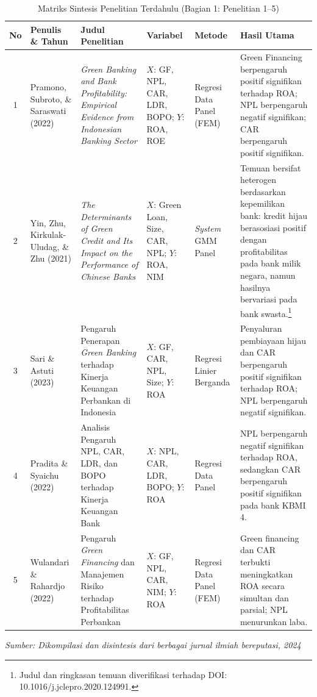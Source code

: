 \documentclass[12pt,a4paper]{article}
\numberwithin{equation}{section}
\begin{document}
\vspace{0.3cm}
\begin{table}[H]
  \caption{Matriks Sintesis Penelitian Terdahulu (Bagian 1: Penelitian 1--5)}
  \label{tab:penelitian_terdahulu_a}
  \footnotesize
  \begin{tabularx}{\textwidth}{|c|>{\raggedright\arraybackslash}p{2.3cm}|>{\raggedright\arraybackslash}X|>{\raggedright\arraybackslash}p{1.9cm}|>{\raggedright\arraybackslash}p{1.8cm}|>{\raggedright\arraybackslash}X|}
    \hline
    \textbf{No} & \textbf{Penulis \& Tahun} & \textbf{Judul Penelitian} & \textbf{Variabel} & \textbf{Metode} & \textbf{Hasil Utama} \\
    \hline
    1 & Pramono, Subroto, \& Saraswati (2022) & \emph{Green Banking and Bank Profitability: Empirical Evidence from Indonesian Banking Sector} & $X$: GF, NPL, CAR, LDR, BOPO; $Y$: ROA, ROE & Regresi Data Panel (FEM) & Green Financing berpengaruh positif signifikan terhadap ROA; NPL berpengaruh negatif signifikan; CAR berpengaruh positif signifikan. \\
    \hline
    2 & Yin, Zhu, Kirkulak-Uludag, \& Zhu (2021) & \emph{The Determinants of Green Credit and Its Impact on the Performance of Chinese Banks} & $X$: Green Loan, Size, CAR, NPL; $Y$: ROA, NIM & \emph{System} GMM Panel & Temuan bersifat heterogen berdasarkan kepemilikan bank: kredit hijau berasosiasi positif dengan profitabilitas pada bank milik negara, namun hasilnya bervariasi pada bank swasta.\footnote{Judul dan ringkasan temuan diverifikasi terhadap DOI: 10.1016/j.jclepro.2020.124991.} \\
    \hline
    3 & Sari \& Astuti (2023) & Pengaruh Penerapan \emph{Green Banking} terhadap Kinerja Keuangan Perbankan di Indonesia & $X$: GF, CAR, NPL, Size; $Y$: ROA & Regresi Linier Berganda & Penyaluran pembiayaan hijau dan CAR berpengaruh positif signifikan terhadap ROA; NPL berpengaruh negatif signifikan. \\
    \hline
    4 & Pradita \& Syaichu (2022) & Analisis Pengaruh NPL, CAR, LDR, dan BOPO terhadap Kinerja Keuangan Bank & $X$: NPL, CAR, LDR, BOPO; $Y$: ROA & Regresi Data Panel & NPL berpengaruh negatif signifikan terhadap ROA, sedangkan CAR berpengaruh positif signifikan pada bank KBMI 4. \\
    \hline
    5 & Wulandari \& Rahardjo (2022) & Pengaruh \emph{Green Financing} dan Manajemen Risiko terhadap Profitabilitas Perbankan & $X$: GF, NPL, CAR, NIM; $Y$: ROA & Regresi Data Panel (FEM) & Green financing dan CAR terbukti meningkatkan ROA secara simultan dan parsial; NPL menurunkan laba. \\
    \hline
  \end{tabularx}
  \begin{flushleft}
    \textit{Sumber: Dikompilasi dan disintesis dari berbagai jurnal ilmiah bereputasi, 2024}
  \end{flushleft}
\end{table}
\end{document}
